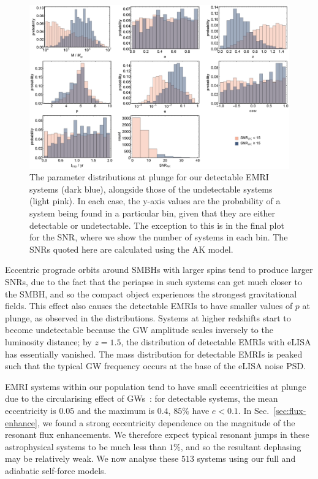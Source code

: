 \documentclass[aps,prd,amsfonts,amssymb,amsmath,nofootinbib,showpacs,superscriptaddress,twocolumn]{revtex4}
\newcommand{\secref}[1]{Sec.~\ref{sec:#1}}
\begin{document}
\begin{figure}
\centering
\includegraphics[width=\textwidth]{EMRIpar_dists}
\caption{\label{fig:EMRIpar-dists}The parameter distributions at plunge for our detectable EMRI systems (dark blue), alongside those of the undetectable systems (light pink). In each case, the y-axis values are the probability of a system being found in a particular bin, given that they are either detectable or undetectable. The exception to this is in the final plot for the SNR, where we show the number of systems in each bin. The SNRs quoted here are calculated using the AK model.}
\end{figure}

Eccentric prograde orbits around SMBHs with larger spins tend to produce larger SNRs, due to the fact that the periapse in such systems can get much closer to the SMBH, and so the compact object experiences the strongest gravitational fields. This effect also causes the detectable EMRIs to have smaller values of $p$ at plunge, as observed in the distributions. Systems at higher redshifts start to become undetectable because the GW amplitude scales inversely to the luminosity distance; by $z = 1.5$, the distribution of detectable EMRIs with eLISA has essentially vanished. The mass distribution for detectable EMRIs is peaked such that the typical GW frequency occurs at the base of the eLISA noise PSD.

EMRI systems within our population tend to have small eccentricities at plunge due to the circularising effect of GWs~\cite{Peters1964}: for detectable systems, the mean eccentricity is $0.05$ and the maximum is $0.4$, $85\%$ have $e < 0.1$. In \secref{flux-enhance}, we found a strong eccentricity dependence on the magnitude of the resonant flux enhancements. We therefore expect typical resonant jumps in these astrophysical systems to be much less than $1\%$, and so the resultant dephasing may be relatively weak. We now analyse these $513$ systems using our full and adiabatic self-force models.
\end{document}

